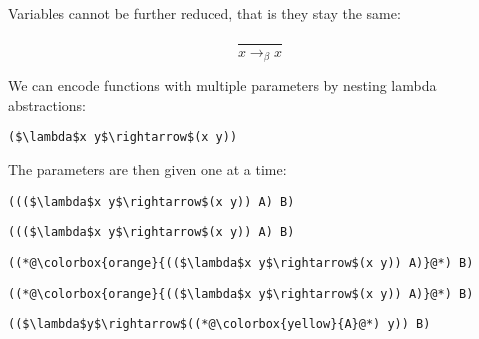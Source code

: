 \documentclass{beamer}
\begin{document}
\begin{frame}[fragile]{\CurrentSection}
\begin{exampleblock}{}
Variables cannot be further reduced, that is they stay the same:
\end{exampleblock}

 
\pause 
$$\frac{}{x \rightarrow_\beta x}$$
 

\end{frame}

\begin{frame}[fragile]{\CurrentSection}
\begin{exampleblock}{}
We can encode functions with multiple parameters by nesting lambda abstractions:
\end{exampleblock}

 
\lstset{basicstyle=\ttfamily\small}\lstset{numbers=none}\lstset{language=ML}\begin{lstlisting}
($\lambda$x y$\rightarrow$(x y))
\end{lstlisting}
 

\end{frame}

\begin{frame}[fragile]{\CurrentSection}
\begin{exampleblock}{}
The parameters are then given one at a time:
\end{exampleblock}

 
\lstset{basicstyle=\ttfamily\small}\lstset{numbers=none}\lstset{language=ML}\begin{lstlisting}
((($\lambda$x y$\rightarrow$(x y)) A) B)
\end{lstlisting}
 

\end{frame}

\begin{frame}[fragile]{\CurrentSection}
\lstset{basicstyle=\ttfamily\small}\lstset{numbers=none}\lstset{language=ML}\begin{lstlisting}
((($\lambda$x y$\rightarrow$(x y)) A) B)
\end{lstlisting}
\pause\lstset{language=ML}\begin{lstlisting}
((*@\colorbox{orange}{(($\lambda$x y$\rightarrow$(x y)) A)}@*) B)
\end{lstlisting}

\end{frame}

\begin{frame}[fragile]{\CurrentSection}
\lstset{basicstyle=\ttfamily\small}\lstset{numbers=none}\lstset{language=ML}\begin{lstlisting}
((*@\colorbox{orange}{(($\lambda$x y$\rightarrow$(x y)) A)}@*) B)
\end{lstlisting}
\pause\lstset{language=ML}\begin{lstlisting}
(($\lambda$y$\rightarrow$((*@\colorbox{yellow}{A}@*) y)) B)
\end{lstlisting}

\end{frame}
\end{document}

